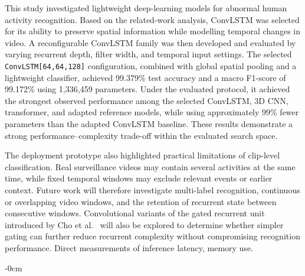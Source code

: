 \documentclass[journal,article,submit,moreauthors]{Definitions/mdpi}
\begin{document}
    This study investigated lightweight deep-learning models for abnormal human activity 
    recognition. Based on the related-work analysis, ConvLSTM was selected for its ability
    to preserve spatial information while modelling temporal changes in video. A 
    reconfigurable ConvLSTM family was then developed and evaluated by varying recurrent 
    depth, filter width, and temporal input settings. The selected 
    \texttt{ConvLSTM[64,64,128]} configuration, combined with global spatial pooling and 
    a lightweight classifier, achieved 99.379\% test accuracy and a macro F1-score of 
    99.172\% using 1,336,459 parameters. Under the evaluated protocol, it achieved the 
    strongest observed performance among the selected ConvLSTM, 3D CNN, 
    transformer, and adapted reference models, while using approximately 99\% 
    fewer parameters than the adapted ConvLSTM baseline. These results demonstrate a strong
    performance--complexity trade-off within the evaluated search space.

    The deployment prototype also highlighted practical limitations of clip-level 
    classification. Real surveillance videos may contain several activities at the same 
    time, while fixed temporal windows may exclude relevant events or earlier context. 
    Future work will therefore investigate multi-label recognition, continuous or overlapping
    video windows, and the retention of recurrent state between consecutive windows. 
    Convolutional variants of the gated recurrent unit introduced by Cho et 
    al.~\cite{cho2014gru} will also be explored to determine whether simpler gating can 
    further reduce recurrent complexity without compromising recognition performance. Direct 
    measurements of inference latency, memory use.


	\begin{adjustwidth}{-\extralength}{0cm}
    
\end{adjustwidth}
\end{document}
